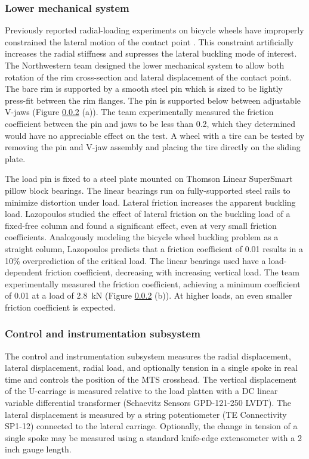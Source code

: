 \documentclass[\rootdir/thesis.tex]{subfiles}
\begin{document}
\subsubsection{Lower mechanical system}

Previously reported radial-loading experiments on bicycle wheels have improperly constrained the lateral motion of the contact point \cite{Burgoyne1993,RARblog,McLundie2007}. This constraint artificially increases the radial stiffness and supresses the lateral buckling mode of interest. The Northwestern team designed the lower mechanical system to allow both rotation of the rim cross-section and lateral displacement of the contact point. The bare rim is supported by a smooth steel pin which is sized to be lightly press-fit between the rim flanges. The pin is supported below between adjustable V-jaws (Figure \ref{} (a)). The team experimentally measured the friction coefficient between the pin and jaws to be less than 0.2, which they determined would have no appreciable effect on the test. A wheel with a tire can be tested by removing the pin and V-jaw assembly and placing the tire directly on the sliding plate.

The load pin is fixed to a steel plate mounted on Thomson Linear SuperSmart pillow block bearings. The linear bearings run on fully-supported steel rails to minimize distortion under load. Lateral friction increases the apparent buckling load. Lazopoulos studied the effect of lateral friction on the buckling load of a fixed-free column \cite{Lazopoulos1991} and found a significant effect, even at very small friction coefficients. Analogously modeling the bicycle wheel buckling problem as a straight column, Lazopoulos predicts that a friction coefficient of 0.01 results in a 10\% overprediction of the critical load. The linear bearings used have a load-dependent friction coefficient, decreasing with increasing vertical load. The team experimentally measured the friction coefficient, achieving a minimum coefficient of 0.01 at a load of \SI{2.8}{\kilo\newton} (Figure \ref{} (b)). At higher loads, an even smaller friction coefficient is expected.

\subsubsection{Control and instrumentation subsystem}

The control and instrumentation subsystem measures the radial displacement, lateral displacement, radial load, and optionally tension in a single spoke in real time and controls the position of the MTS crosshead. The vertical displacement of the U-carriage is measured relative to the load platten with a DC linear variable differential transformer (Schaevitz Sensors GPD-121-250 LVDT). The lateral displacement is measured by a string potentiometer (TE Connectivity SP1-12) connected to the lateral carriage. Optionally, the change in tension of a single spoke may be measured using a standard knife-edge extensometer with a 2 inch gauge length.
\end{document}
